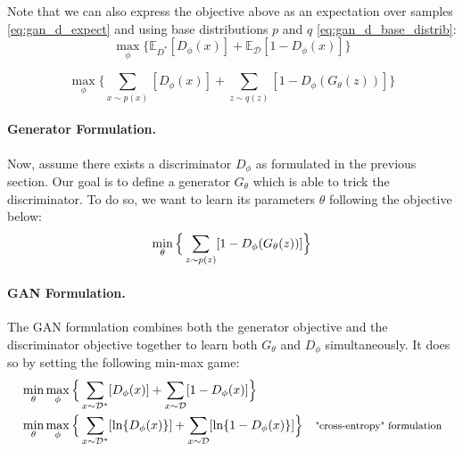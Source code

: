 \documentclass[11pt]{article}
\begin{document}
Note that we can also express the objective above as an expectation over samples \eqref{eq:gan_d_expect} and using base distributions $p$ and $q$ \eqref{eq:gan_d_base_distrib}:
\begin{equation}
    \label{eq:gan_d_expect}
    \max_{\phi} \Big\{ 
    \mathbb{E}_{D^\ast} [D_{\phi}(x)] + \mathbb{E}_\mathcal{D} [1 - D_{\phi}(x)] \Big\}
\end{equation}

\begin{equation}
    \label{eq:gan_d_base_distrib}
    \max_{\phi} \Big\{ 
    \sum\limits_{x\sim p(x)} [D_{\phi}(x)] +
    \sum\limits_{z\sim q(z)} [1 - D_{\phi}(G_{\theta}(z))] \Big\}
\end{equation}

\paragraph{Generator Formulation.}

Now, assume there exists a discriminator $D_{\phi}$ as formulated in the previous section. Our goal is to define a generator $G_\theta$ which is able to trick the discriminator. To do so, we want to learn its parameters $\theta$ following the objective below:
\begin{equation}
    \label{eq:gan_g}
    \min_{\theta} \Big\{ 
    \sum\limits_{z \sim p(z)} [1 - D_{\phi}(G_{\theta}(z))] \Big\} \\
\end{equation}

\paragraph{GAN Formulation.}

The GAN formulation combines both the generator objective and the discriminator objective together to learn both $G_\theta$ and $D_\phi$ simultaneously. It does so by setting the following min-max game:
\begin{align}
    \label{eq:gan}
    &\min_\theta \max_{\phi} \Big\{ 
    \sum\limits_{x\sim \mathcal{D}^\ast} [D_{\phi}(x)] +
    \sum\limits_{x\sim \mathcal{D}} [1 - D_{\phi}(x)] \Big\} \\
    &\min_\theta \max_{\phi} \Big\{ 
    \sum\limits_{x\sim \mathcal{D}^\ast} [\ln \{D_{\phi}(x)\}] +
    \sum\limits_{x\sim \mathcal{D}} [\ln\{1 - D_{\phi}(x)\}] \Big\} \quad \text{\footnotesize{"cross-entropy" formulation}}
\end{align}
\end{document}
